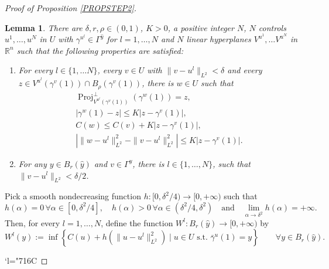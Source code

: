 \documentclass[JEP,XML,SOM,Unicode,NoFloatCountersInSection,published]{cedram}
\newenvironment{enumeratei}
{\bgroup\def\theenumi{\roman{enumi}}\def\theenumii{\arabic{enumii}}\begin{enumerate}}
{\end{enumerate}\egroup}
\newcommand{\Changelback}{\mathcode`l="716C}
\let\sep\mid
\DeclareMathOperator{\Proj}{Proj}
\newcommand\R{\mathbb R}
\newtheorem{lemma}[theorem]{Lemma}
\theoremstyle{definition}
\begin{document}
\begin{proof}[Proof of Proposition \ref{PROPSTEP2}]
\begin{lemma}\label{STEP2_LEM4}
There are $\delta, r , \rho \in (0,1)$, $K>0$, a positive integer $N$, $N$ controls $u^1, \ldots, u^{N}$ in $U$ with $\gamma^{u^l}\in \Gamma^{\hat{y}}$ for $l=1, \ldots, N$ and $N$ linear hyperplanes $V^{u^1}, \ldots V^{u^{N}}$ in $\R^n$ such that the following properties are satisfied:
\begin{enumeratei}
\item\label{STEP2_LEM4i}
For every $l\in \{1, \ldots N\}$, every $v\in U$ with $\|v-u^l\|_{L^2} < \delta$ and every $z\in V^{u^l}(\gamma^v(1)) \cap B_{\rho}(\gamma^v(1))$, there is $w \in U$ such that
\begin{gather}\label{24oct1}
\Proj_{V^{u^l}(\gamma^v(1))}^{\perp} \left(\gamma^{w}(1)\right)=z,
\\
\label{24oct1bis}
\left| \gamma^w(1)-z \right| \leq K \left| z-\gamma^v(1)\right|,
\\
\label{24oct2}
C(w) \leq C(v) + K \left|z - \gamma^v(1)\right|,
\\
\label{24oct3}
\left| \| w-u^l\|_{L^2}^2 - \| v-u^l\|_{L^2}^2 \right| \leq K \left| z-\gamma^v(1)\right|.
\end{gather}
\item\label{STEP2_LEM4ii}
For any $y \in B_r(\hat{y})$ and $v \in \Gamma^y$, there is $l\in \{1, \ldots, N\}$, such that $\|v-u^l\|_{L^2} < \delta/2$.
\end{enumeratei}
\end{lemma}

Pick a smooth nondecreasing function $h:[0,\delta^2/4) \to [0,+\infty)$ such that
\[
h(\alpha) = 0 \, \forall \alpha \in [0,\delta^2/4], \quad h(\alpha) > 0 \, \forall \alpha \in (\delta^2/4,\delta^2) \quad \text{and} \quad \lim_{\alpha \to \delta^2} h(\alpha)= +\infty.
\]
Then, for every $l=1, \ldots, N$, define the function $W^l: B_r(\hat{y}) \to [0,+\infty)$ by
\[
W^l(y) := \inf \left\{ C(u) + h\left(\|u-u^l\|_{L^2}^2\right) \sep  u \in U \text{ s.t. } \bar{\gamma}^{u}(1)=y \right\} \qquad \forall y \in B_r(\hat{y}).
\]

\Changelback


\end{proof}
\end{document}

